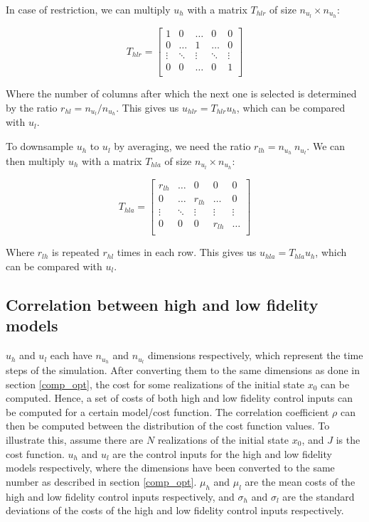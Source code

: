 \documentclass{article}
\begin{document}
In case of restriction, we can multiply $u_h$ with a matrix $T_{hlr}$ of size $n_{u_l} \times n_{u_h}$:

\begin{equation}
  T_{hlr} =
  \begin{bmatrix}
    1 & 0 & \ldots & 0 & 0 \\
    0 & \ldots & 1 & \ldots & 0 \\
    \vdots & \ddots & \vdots & \ddots & \vdots \\
    0 & 0 & \ldots & 0 & 1 \\
  \end{bmatrix}
\end{equation}

Where the number of columns after which the next one is selected is determined by the ratio $r_{hl} = n_{u_l} / n_{u_h}$.
This gives us $u_{hlr} = T_{hlr} u_h$, which can be compared with $u_l$.

To downsample $u_h$ to $u_l$ by averaging, we need the ratio $r_{lh} = n_{u_h} \ n_{u_l}$.
We can then multiply $u_h$ with a matrix $T_{hla}$ of size $n_{u_l} \times n_{u_h}$:

\begin{equation}
  T_{hla} =
  \begin{bmatrix}
    r_{lh} & \ldots & 0 & 0 & 0 \\
    0 & \ldots & r_{lh} & \ldots & 0 \\
    \vdots & \ddots & \vdots & \vdots & \vdots \\
    0 & 0 & 0 & r_{lh} & \ldots \\
  \end{bmatrix}
\end{equation}

Where $r_{lh}$ is repeated $r_{hl}$ times in each row.
This gives us $u_{hla} = T_{hla} u_h$, which can be compared with $u_l$.

\subsection{Correlation between high and low fidelity models}

$u_h$ and $u_l$ each have $n_{u_h}$ and $n_{u_l}$ dimensions respectively, which represent the time steps of the simulation.
After converting them to the same dimensions as done in section \ref{comp_opt},
the cost for some realizations of the initial state $x_0$ can be computed.
Hence, a set of costs of both high and low fidelity control inputs can be computed for a certain model/cost function.
The correlation coefficient $\rho$ can then be computed between the distribution of the cost function values.
To illustrate this, assume there are $N$ realizations of the initial state $x_0$, and $J$ is the cost function.
$u_h$ and $u_l$ are the control inputs for the high and low fidelity models respectively, where the dimensions have been
converted to the same number as described in section \ref{comp_opt}. $\mu_h$ and $\mu_l$ are the mean costs
of the high and low fidelity control inputs respectively, and $\sigma_h$ and $\sigma_l$ are the standard deviations of
the costs of the high and low fidelity control inputs respectively.
\end{document}
